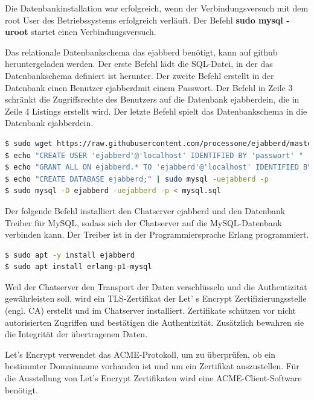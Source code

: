 \documentclass[a4paper,titlepage,halfparskip,12pt]{scrreprt}
\begin{document}
\begin{onehalfspacing}
Die Datenbankinstallation war erfolgreich, wenn der Verbindungsversuch mit dem root User des Betriebssystems erfolgreich verläuft. Der Befehl \textbf{sudo mysql -uroot} startet einen Verbindungsversuch.

Das relationale Datenbankschema das ejabberd benötigt, kann auf github heruntergeladen werden. Der erste Befehl lädt die SQL-Datei, in der das Datenbankschema definiert ist herunter. Der zweite Befehl erstellt in der Datenbank einen Benutzer \glqq ejabberd\grqq mit einem Passwort. Der Befehl in Zeile 3 schränkt die Zugriffsrechte des Benutzers auf die Datenbank \glqq ejabberd\grqq ein, die in Zeile 4 Listings erstellt wird. Der letzte Befehl spielt das Datenbankschema in die Datenbank \glqq ejabberd\grqq ein.

\bigskip

 \begin{lstlisting}[language=bash, caption={Installation der Mysql-Datenbank}]
$ sudo wget https://raw.githubusercontent.com/processone/ejabberd/master/sql/mysql.sql
$ echo "CREATE USER 'ejabberd'@'localhost' IDENTIFIED BY 'passwort' " | sudo mysql -uroot
$ echo "GRANT ALL ON ejabberd.* TO 'ejabberd'@'localhost' IDENTIFIED BY 'passwort';" | sudo mysql -uroot
$ echo "CREATE DATABASE ejabberd;" | sudo mysql -uejabberd -p
$ sudo mysql -D ejabberd -uejabberd -p < mysql.sql
\end{lstlisting}



Der folgende Befehl installiert den Chatserver ejabberd und den Datenbank Treiber für MySQL, sodass sich der Chatserver auf die MySQL-Datenbank verbinden kann. Der Treiber ist in der Programmiersprache Erlang programmiert.

\bigskip

\begin{lstlisting}[language=bash, caption={Installation von ejabberd und des MySQL Datenbanktreibers}]
$ sudo apt -y install ejabberd
$ sudo apt install erlang-p1-mysql
\end{lstlisting}

Weil der Chatserver den Transport der Daten verschlüsseln und die Authentizität gewährleisten soll, wird ein TLS-Zertifikat der Let' s Encrypt Zertifizierungsstelle (engl. \ac{CA}) erstellt und im Chatserver installiert. Zertifikate schützen vor nicht autorisierten Zugriffen und bestätigen die Authentizität. Zusätzlich bewahren sie die Integrität der übertragenen Daten.\cite{melzer2010web}

Let's Encrypt verwendet das ACME-Protokoll, um zu überprüfen, ob ein bestimmter Domainname vorhanden ist und um ein Zertifikat auszustellen. Für die Ausstellung von Let's Encrypt Zertifikaten wird eine ACME-Client-Software benötigt.\cite{letsencryptACME}


\end{onehalfspacing}
\end{document}
